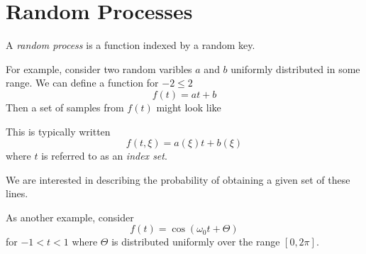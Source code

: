 \section{Random Processes}
A \emph{random process} is a function
indexed by a random key.

For example, consider two random
varibles $a$ and $b$ uniformly
distributed in some range. We can define
a function for $-2 \leq 2$
\begin{equation}
    f(t) = at + b
\end{equation}
Then a set of samples from $f(t)$ might
look like

\begin{center}
\end{center}

This is typically written
\begin{equation}
    f(t, \xi) = a(\xi)t + b(\xi)
\end{equation}
where $t$ is referred to as an \emph{index set}.

We are interested in describing the probability
of obtaining a given set of these lines.

As another example, consider
\begin{equation}
    f(t) = \cos(\omega_0 t + \Theta)
\end{equation}
for $ -1 < t < 1$ where $\Theta$ is
distributed uniformly over the range
$[0, 2\pi]$.

\begin{center}
\end{center}

